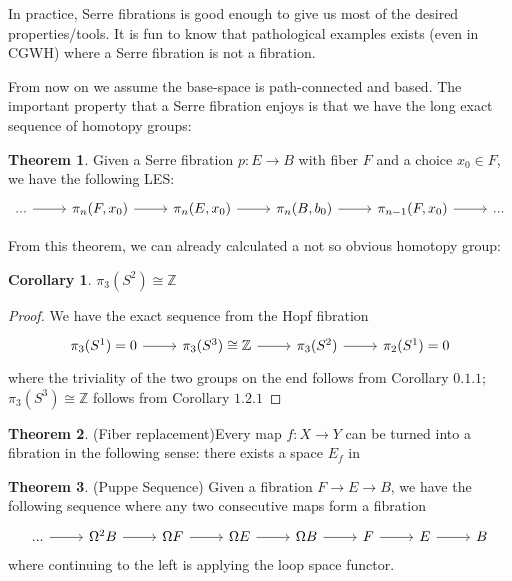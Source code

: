 \documentclass{article}
\theoremstyle{definition}
\newtheorem{theorem}{Theorem}[section]
\theoremstyle{definition}
\theoremstyle{definition}
\theoremstyle{definition}
\theoremstyle{definition}
\theoremstyle{definition}
\newtheorem{corollary}{Corollary}[theorem]
\theoremstyle{definition}
\begin{document}
In practice, Serre fibrations is good enough to give us most of the desired properties/tools. It is fun to know that pathological examples exists (even in CGWH) where a Serre fibration is not a fibration. 

From now on we assume the base-space is path-connected and based. The important property that a Serre fibration enjoys is that we have the long exact sequence of homotopy groups:
\begin{tcolorbox}[colback=red!5!white,colframe=red!30!white]
\begin{theorem}
Given a Serre fibration $p:E\to B$ with fiber $F$ and a choice $x_0\in F$, we have the following LES:
\[
\begin{tikzcd}
...\arrow[r]&\pi_n(F,x_0)\arrow[r]&\pi_n(E,x_0)\arrow[r]&\pi_n(B,b_0)\arrow[r]&\pi_{n-1}(F,x_0)\arrow[r]&...
\end{tikzcd}
\]
\end{theorem}
\end{tcolorbox}
From this theorem, we can already calculated a not so obvious homotopy group:
\begin{tcolorbox}[colback=green!5!white,colframe=green!30!white]
\begin{corollary}
$\pi_3(S^2)\cong \mathbb{Z}$
\end{corollary}
\end{tcolorbox}
\begin{proof}
    We have the exact sequence from the Hopf fibration
    \[
    \begin{tikzcd}
    \pi_3(S^1)=0\arrow[r]&\pi_3(S^3)\cong \mathbb{Z}\arrow[r]&\pi_3(S^2)\arrow[r]&\pi_2(S^1)=0
    \end{tikzcd}
    \]
    where the triviality of the two groups on the end follows from Corollary $0.1.1$; $\pi_3(S^3)\cong \mathbb{Z}$ follows from Corollary $1.2.1$
\end{proof}
 

\begin{tcolorbox}[colback=red!5!white,colframe=red!30!white]
\begin{theorem}
(Fiber replacement)Every map $f: X\to Y$ can be turned into a fibration in the following sense: there exists a space $E_f$ in 
\end{theorem}
\end{tcolorbox}

\begin{tcolorbox}[colback=red!5!white,colframe=red!30!white]
\begin{theorem}
(Puppe Sequence) Given a fibration $F\to E\to B$, we have the following sequence where any two consecutive maps form a fibration
\[
\begin{tikzcd}
    ...\arrow[r]&\Omega^2B\arrow[r]&\Omega F\arrow[r]&\Omega E\arrow[r]&\Omega B\arrow[r]&F\arrow[r]&E\arrow[r]&B
\end{tikzcd}
\]
where continuing to the left is applying the loop space functor.
\end{theorem}
\end{tcolorbox}
\end{document}
